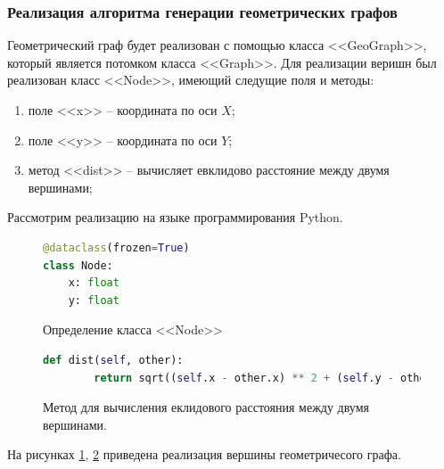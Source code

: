 \subsubsection{Реализация алгоритма генерации геометрических графов}
Геометрический граф будет реализован с 
помощью класса <<GeoGraph>>, который 
является потомком класса <<Graph>>. Для
реализации веришн был реализован класс <<Node>>, имеющий следущие
поля и методы:
\begin{enumerate}
    \item поле <<x>> -- координата по оси  $X$;
    \item  поле  <<y>> -- координата по оси $Y$;
    \item метод  <<dist>> -- вычисляет евклидово расстояние между 
        двумя вершинами;
\end{enumerate}
Рассмотрим реализацию на языке программирования Python.

\begin{figure}[H] 
\begin{lstlisting}[language=Python] 
@dataclass(frozen=True)
class Node:
    x: float
    y: float
\end{lstlisting}  
    \caption{Определение класса <<Node>>}
    \label{pynode_1}
\end{figure} 
\begin{figure}[H] 
\begin{lstlisting}[language=Python] 
    def dist(self, other):
        return sqrt((self.x - other.x) ** 2 + (self.y - other.y)**2)
\end{lstlisting}  
    \caption{Метод для вычисления еклидового расстояния между двумя вершинами.}
    \label{pynode_2}
\end{figure} 
На рисунках \ref{pynode_1}, \ref{pynode_2} приведена реализация вершины 
геометричесого графа.

